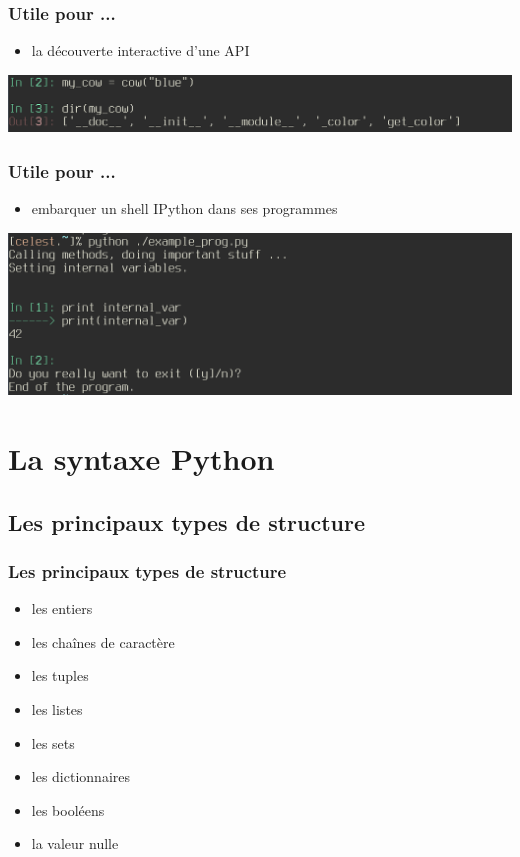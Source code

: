 \begin{frame}
  \frametitle{Utile pour ...}
    \begin{itemize}
      \item la découverte interactive d'une API
    \end{itemize}
  \includegraphics[scale=0.35]{api_discover.png}
\end{frame}

\begin{frame}
  \frametitle{Utile pour ...}
    \begin{itemize}
      \item embarquer un shell IPython dans ses programmes
    \end{itemize}
  \includegraphics[scale=0.35]{embedded_ipython.png}
\end{frame}

\section{La syntaxe Python}
\subsection{Les principaux types de structure}

\begin{frame}
  \frametitle{Les principaux types de structure}
    \begin{itemize}
      \item<1-> les entiers
      \item<2-> les chaînes de caractère
      \item<3-> les tuples
      \item<4-> les listes
      \item<5-> les sets
      \item<6-> les dictionnaires
      \item<7-> les booléens
      \item<8-> la valeur nulle
    \end{itemize}
\end{frame}

